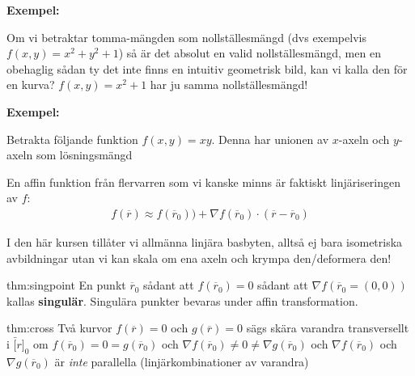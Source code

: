 \par\bigskip
\noindent\textbf{Exempel:}\par
\noindent Om vi betraktar tomma-mängden som nollställesmängd (dvs exempelvis $f(x,y) = x^2+y^2+1$) så är det absolut en valid nollställesmängd, men en obehaglig sådan ty det inte finns en intuitiv geometrisk bild, kan vi kalla den för en kurva? $f(x,y) = x^2+1$ har ju samma nollställesmängd!
\par\bigskip
\noindent\textbf{Exempel:}\par
\noindent Betrakta följande funktion $f(x,y)=xy$. Denna har unionen av $x$-axeln och $y$-axeln som lösningsmängd
\par\bigskip
\noindent En affin funktion från flervarren som vi kanske minns är faktiskt linjäriseringen av $f$:
\begin{equation*}
  \begin{gathered}
    f(\overline{r})\approx f(\overline{r}_0))+\nabla f(\overline{r}_0)\cdot (\overline{r}-\overline{r}_0)
  \end{gathered}
\end{equation*}
\par\bigskip
\noindent I den här kursen tillåter vi allmänna linjära basbyten, alltså ej bara isometriska avbildningar utan vi kan skala om ena axeln och krympa den/deformera den!
\par\bigskip
\begin{theo}{thm:singpoint}
  En punkt $\overline{r}_0$ sådant att $f(\overline{r}_0)=0$ sådant att $\nabla f(\overline{r}_0=(0,0))$ kallas \textbf{singulär}. Singulära punkter bevaras under affin transformation. 
\end{theo}
\par\bigskip
\begin{theo}{thm:cross}
  Två kurvor $f(\overline{r})= 0$ och $g(\overline{r})=0$ sägs skära varandra transversellt i $\bar[r]_0$ om $f(\overline{r}_0) = 0 = g(\overline{r}_0)$ och $\nabla f(\overline{r}_0) \neq 0 \neq \nabla g(\overline{r}_0)$ och $\nabla f(\overline{r}_0)$ och $\nabla g(\overline{r}_0)$ är \textit{inte} parallella (linjärkombinationer av varandra)
\end{theo}
